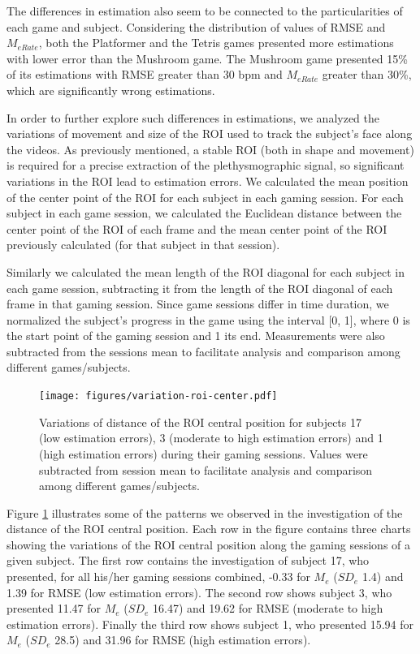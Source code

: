 The differences in estimation also seem to be connected to the particularities of each game and subject. Considering the distribution of values of RMSE and $M_{eRate}$, both the Platformer and the Tetris games presented more estimations with lower error than the Mushroom game. The Mushroom game presented 15\% of its estimations with RMSE greater than 30 bpm and $M_{eRate}$ greater than 30\%, which are significantly wrong estimations.

In order to further explore such differences in estimations, we analyzed the variations of movement and size of the ROI used to track the subject's face along the videos. As previously mentioned, a stable ROI (both in shape and movement) is required for a precise extraction of the plethysmographic signal, so significant variations in the ROI lead to estimation errors. We calculated the mean position of the center point of the ROI for each subject in each gaming session. For each subject in each game session, we calculated the Euclidean distance between the center point of the ROI of each frame and the mean center point of the ROI previously calculated (for that subject in that session).

Similarly we calculated the mean length of the ROI diagonal for each subject in each game session, subtracting it from the length of the ROI diagonal of each frame in that gaming session. Since game sessions differ in time duration, we normalized the subject's progress in the game using the interval [0, 1], where 0 is the start point of the gaming session and 1 its end. Measurements were also subtracted from the sessions mean to facilitate analysis and comparison among different games/subjects.

\begin{figure}[!h]
\centering
\texttt{[image: figures/variation-roi-center.pdf]}
\caption{Variations of distance of the ROI central position for subjects 17 (low estimation errors), 3 (moderate to high estimation errors) and 1 (high estimation errors) during their gaming sessions. Values were subtracted from session mean to facilitate analysis and comparison among different games/subjects.}
\label{fig:chart-roi-anomalies-center}
\end{figure}

Figure \ref{fig:chart-roi-anomalies-center} illustrates some of the patterns we observed in the investigation of the distance of the ROI central position. Each row in the figure contains three charts showing the variations of the ROI central position along the gaming sessions of a given subject. The first row contains the investigation of subject 17, who presented, for all his/her gaming sessions combined, -0.33 for $M_e$ ($SD_e$ 1.4) and 1.39 for RMSE (low estimation errors). The second row shows subject 3, who presented 11.47 for $M_e$ ($SD_e$ 16.47) and 19.62 for RMSE (moderate to high estimation errors). Finally the third row shows subject 1, who presented 15.94 for $M_e$ ($SD_e$ 28.5) and 31.96 for RMSE (high estimation errors).

